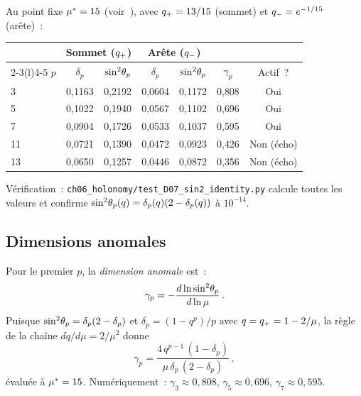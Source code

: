 \documentclass[12pt,a4paper]{article}
\begin{document}
Au point fixe ${\mu^{*}} = 15$ (voir~\cite{companion_M3}), avec
$q_{+} = 13/15$ (sommet) et $q_{-} = e^{-1/15}$ (arête)~:

\begin{center}
\begin{tabular}{lcccccc}
\toprule
& \multicolumn{2}{c}{\textbf{Sommet} ($q_{+}$)} & \multicolumn{2}{c}{\textbf{Arête} ($q_{-}$)} & & \\
\cmidrule(r){2-3}\cmidrule(l){4-5}
$p$ & $\delta_p$ & $\sin^2\!\theta_{p}$ & $\delta_p$ & $\sin^2\!\theta_{p}$ & $\gamma_p$ & Actif~? \\
\midrule
3 & 0{,}1163 & 0{,}2192 & 0{,}0604 & 0{,}1172 & 0{,}808 & Oui \\
5 & 0{,}1022 & 0{,}1940 & 0{,}0567 & 0{,}1102 & 0{,}696 & Oui \\
7 & 0{,}0904 & 0{,}1726 & 0{,}0533 & 0{,}1037 & 0{,}595 & Oui \\
11 & 0{,}0721 & 0{,}1390 & 0{,}0472 & 0{,}0923 & 0{,}426 & Non (écho) \\
13 & 0{,}0650 & 0{,}1257 & 0{,}0446 & 0{,}0872 & 0{,}356 & Non (écho) \\
\bottomrule
\end{tabular}
\end{center}

Vérification~: \texttt{ch06\_holonomy/test\_D07\_sin2\_identity.py}
calcule toutes les valeurs et confirme
$\sin^2\!\theta_{p}(q) = \delta_p(q)(2-\delta_p(q))$ à $10^{-14}$.

\subsection{Dimensions anomales}
\label{sec:anomalous_dim}

\begin{definition}
\label{def:anomalous_dim}
Pour le premier $p$, la \emph{dimension anomale} est~:
\begin{equation}
  \gamma_p = -\frac{d \ln \sin^2\!\theta_{p}}{d \ln \mu}\,.
  \label{eq:gamma_p}
\end{equation}
Puisque $\sin^2\!\theta_{p} = \delta_p(2 - \delta_p)$ et
$\delta_p = (1 - q^p)/p$ avec $q = q_{+} = 1 - 2/\mu$,
la règle de la chaîne $dq/d\mu = 2/\mu^2$ donne
\begin{equation}
  \gamma_p
  = \frac{4\,q^{p-1}\,(1 - \delta_p)}
         {\mu\,\delta_p\,(2 - \delta_p)}\,,
  \label{eq:gamma_closed}
\end{equation}
évaluée à ${\mu^{*}} = 15$. Numériquement~:
$\gamma_3 \approx 0{,}808$, $\gamma_5 \approx 0{,}696$,
$\gamma_7 \approx 0{,}595$.
\end{definition}
\end{document}
